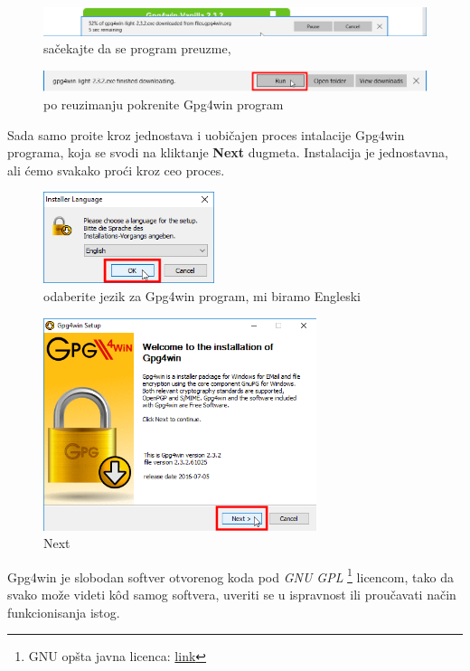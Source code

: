 \documentclass[a4paper,11pt]{article}
\begin{document}
\begin{figure}[!h]
	\begin{center}
		\includegraphics[width=\textwidth]{04_Downloading_Gpg4win.png}
		\caption{sa\v{c}ekajte da se program preuzme, }
		\label{initialscreen}
	\end{center}
\end{figure}
\begin{figure}[!h]
	\begin{center}
		\includegraphics[width=\textwidth]{05_Gpg4win_Downloaded_Gpg4win.png}
		\caption{po reuzimanju pokrenite Gpg4win program}
		\label{initialscreen}
	\end{center}
\end{figure}
\newpage
Sada samo pro\dj{}ite kroz jednostava i uobi\v{c}ajen proces intalacije Gpg4win programa, koja se svodi na kliktanje \textbf{Next} dugmeta. Instalacija je jednostavna, ali \'{c}emo svakako pro\'{c}i kroz ceo proces.
\begin{figure}[!h]
	\begin{center}
		\includegraphics[width=5cm]{06_Gpg4win_Installer_Language.png}
		\caption{odaberite jezik za Gpg4win program, mi biramo Engleski}
		\label{initialscreen}
	\end{center}
\end{figure}
\begin{figure}[!h]
	\begin{center}
		\includegraphics[width=8cm]{07_Gpg4win_Setup.png}
		\caption{Next}
		\label{initialscreen}
	\end{center}
\end{figure}
\newline
Gpg4win je slobodan softver otvorenog koda pod \textit{GNU GPL}%
\footnote{GNU op\v{s}ta javna licenca: \href{https://goo.gl/mONh8W}{link}} licencom, tako da svako mo\v{z}e videti k\^{o}d samog softvera, uveriti se u ispravnost ili prou\v{c}avati na\v{c}in funkcionisanja istog.
\end{document}
